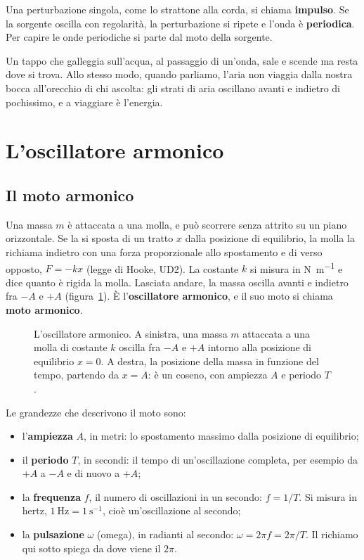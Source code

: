 Una perturbazione singola, come lo strattone alla corda, si chiama \textbf{impulso}. Se la sorgente oscilla con regolarità, la perturbazione si ripete e l'onda è \textbf{periodica}. Per capire le onde periodiche si parte dal moto della sorgente.

\begin{attenzione}
Un tappo che galleggia sull'acqua, al passaggio di un'onda, sale e scende ma resta dove si trova. Allo stesso modo, quando parliamo, l'aria non viaggia dalla nostra bocca all'orecchio di chi ascolta: gli strati di aria oscillano avanti e indietro di pochissimo, e a viaggiare è l'energia.
\end{attenzione}

\section{L'oscillatore armonico}
\label{sec:ud4-oscillatore}

\subsection{Il moto armonico}

Una massa $m$ è attaccata a una molla, e può scorrere senza attrito su un piano orizzontale. Se la si sposta di un tratto $x$ dalla posizione di equilibrio, la molla la richiama indietro con una forza proporzionale allo spostamento e di verso opposto, $F = -kx$ (legge di Hooke, UD2). La costante $k$ si misura in \si{\newton\per\metre} e dice quanto è rigida la molla. Lasciata andare, la massa oscilla avanti e indietro fra $-A$ e $+A$ (figura~\ref{fig:ud4-oscillatore}). È l'\textbf{oscillatore armonico}, e il suo moto si chiama \textbf{moto armonico}.

\begin{figure}[h]
\centering

\caption{L'oscillatore armonico. A sinistra, una massa $m$ attaccata a una molla di costante $k$ oscilla fra $-A$ e $+A$ intorno alla posizione di equilibrio $x = 0$. A destra, la posizione della massa in funzione del tempo, partendo da $x = A$: è un coseno, con ampiezza $A$ e periodo $T$.}
\label{fig:ud4-oscillatore}
\end{figure}

Le grandezze che descrivono il moto sono:
\begin{itemize}
  \item l'\textbf{ampiezza} $A$, in metri: lo spostamento massimo dalla posizione di equilibrio;
  \item il \textbf{periodo} $T$, in secondi: il tempo di un'oscillazione completa, per esempio da $+A$ a $-A$ e di nuovo a $+A$;
  \item la \textbf{frequenza} $f$, il numero di oscillazioni in un secondo: $f = 1/T$. Si misura in hertz, $\SI{1}{\hertz} = \SI[per-mode=power]{1}{\second\tothe{-1}}$, cioè un'oscillazione al secondo;
  \item la \textbf{pulsazione} $\omega$ (omega), in radianti al secondo: $\omega = 2\pi f = 2\pi/T$. Il richiamo qui sotto spiega da dove viene il $2\pi$.
\end{itemize}

